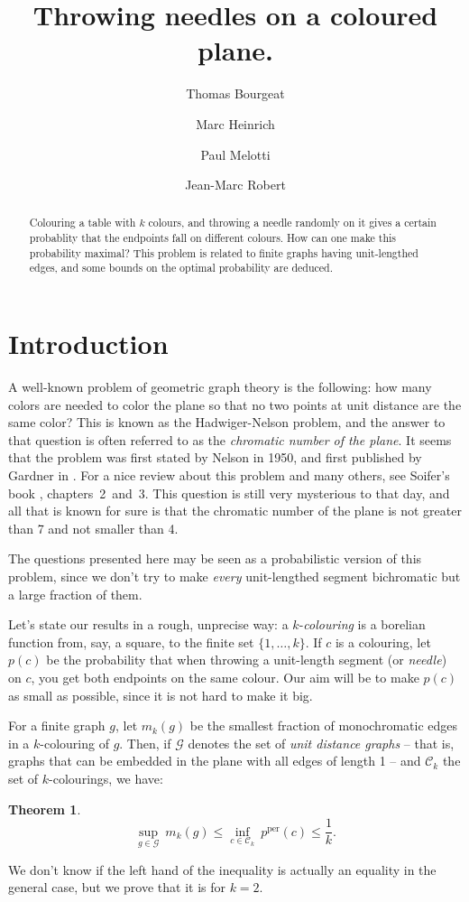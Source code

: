 \documentclass[a4paper,11pt]{article}
\title{Throwing needles on a coloured plane.}
\author[1]{Thomas Bourgeat}
\author[1]{Marc Heinrich}
\author[1]{Paul Melotti}
\affil[1]{Computer science departement,\authorcr
\'Ecole Normale Sup\'erieure, Paris, France\authorcr
		  \texttt{\{surname\}.\{name\}@ens.fr}
}
\author[2]{Jean-Marc Robert}
\affil[2]{Software engeneering and IT departement,\authorcr
Ecole de Technologie Sup\'erieure, Montreal, Canada\authorcr
		  \texttt{jean-marc.robert@etsmlt.ca}
}
\newtheorem*{theo*}{Theorem}
\theoremstyle{definition}
\theoremstyle{remark}
\newcommand{\C}{\mathcal{C}}
\newcommand{\pper}{p^{\mathrm{per}}}
\begin{document}
\maketitle

\begin{abstract} Colouring a table with $k$ colours, and throwing a needle
randomly on it gives a certain probablity that the endpoints fall on 
different colours. How can one make this probability maximal?
This problem is related to finite graphs having unit-lengthed edges, and 
some bounds on the optimal probability are deduced.\end{abstract}

\section{Introduction}

A well-known problem of geometric graph theory is the following: how many colors
are needed to color the plane so that no two points at unit distance are the 
same color? This is known as the Hadwiger-Nelson problem, and the answer to that
question is often referred to as the \textit{chromatic number of the plane}. It 
seems that the problem was first stated by Nelson in 1950, and first published by 
Gardner in \cite{gardner}.
For a nice review about this problem and many others, see Soifer's book
\cite{soifer}, chapters~2~and~3. This question is still very mysterious to that day, and all that 
is known for sure is that the chromatic number of the plane is not greater than
7 and not smaller than 4.

The questions presented here may be seen as a probabilistic version of this 
problem, since we don't try to make \textit{every} unit-lengthed segment 
bichromatic but a large fraction of them.

\medskip

Let's state our results in a rough, unprecise way: a $k$-\textit{colouring} is a borelian 
function from, say, a square, to the finite set $\{1, \dots , k \}$. If $c$
is a colouring, let $p(c)$ be the probability that when throwing a unit-length
segment (or \textit{needle}) on $c$, you get both endpoints on the same colour.
Our aim will be to make $p(c)$ as small as possible, since it is not hard
to make it big.

For a finite graph $g$, let $m_k(g)$ be the smallest fraction of monochromatic
edges in a $k$-colouring of $g$. Then, if $\mathcal{G}$ denotes the set of 
\textit{unit distance graphs} -- that is, graphs that can be embedded in the
plane with all edges of length 1 -- and $\C_k$ the set of $k$-colourings, we
have:
\begin{theo*}
$$ \sup_{g \in \mathcal{G}} \ m_k(g) \leq \inf_{c \in \C_k} \ \pper(c) \leq \frac{1}{k}. $$
\end{theo*}
We don't know if the left hand of the inequality is actually an equality in
the general case, but we prove that it is for $k=2$.
\end{document}
